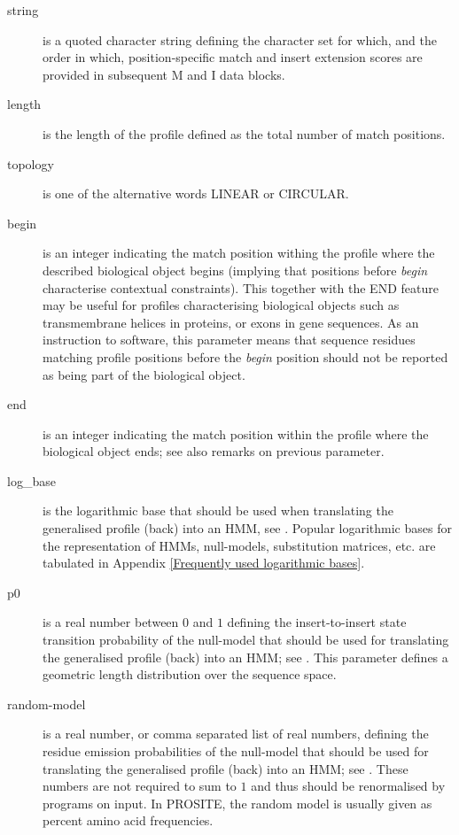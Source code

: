 \documentclass[a4paper,10pt,twoside]{scrartcl}
\begin{document}
  \begin{description}
  \item[string] is a quoted character string defining the character set for which, and the order in which, position-specific match and insert
      extension scores are provided in subsequent M and I data blocks.
  \item[length] is the length of the profile defined as the total number of match positions.
  \item[topology] is one of the alternative words LINEAR or CIRCULAR.
  \item[begin] is an integer indicating the match position withing the profile where the described biological object begins (implying that positions
      before \emph{begin} characterise contextual constraints). This together with the END feature may be useful for profiles characterising biological objects
      such as transmembrane helices in proteins, or exons in gene sequences.  As an instruction to software, this parameter means that sequence residues matching
      profile positions before the \emph{begin} position should not be reported as being part of the biological object.
  \item[end] is an integer indicating the match position within the profile where the biological object ends; see also remarks on previous parameter.
  \item[log\_base] is the logarithmic base that should be used when translating the generalised profile (back) into an HMM, see \cite{Bucher96}. Popular logarithmic
      bases for the representation of HMMs, null-models, substitution matrices, etc. are tabulated in Appendix \ref{Frequently used logarithmic bases}.
  \item[p0] is a real number between $0$ and $1$ defining the insert-to-insert state transition probability of the null-model that should be used for
      translating the generalised profile (back) into an HMM; see \cite{Bucher96}. This parameter defines a geometric length distribution over the sequence space.
  \item[random-model] is a real number, or comma separated list of real numbers, defining the residue emission probabilities of the null-model
      that should be used for translating the generalised profile (back) into an HMM; see \cite{Bucher96}. These numbers are not required to sum to $1$ and thus
      should be renormalised by programs on input. In PROSITE, the random model is usually given as percent amino acid frequencies.
 \end{description}
  
\end{document}
